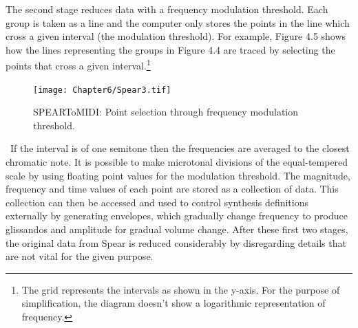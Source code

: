The second stage reduces data with a frequency modulation threshold. Each group is taken as a line and the computer only stores the points in the line which cross a given interval (the modulation threshold). For example, Figure 4.5 shows how the lines representing the groups in Figure 4.4 are traced by selecting the points that cross a given interval.\footnote{The grid represents the intervals as shown in the y-axis. For the purpose of simplification, the diagram doesn't show a logarithmic representation of frequency.} 
\begin{figure}[htbp] %
   \centering
   \texttt{[image: Chapter6/Spear3.tif]} %
   \caption{SPEARToMIDI: Point selection through frequency modulation threshold.}
   \label{fig:example}
\end{figure}\
If the interval is of one semitone then the frequencies are averaged to the closest chromatic note. It is possible to make microtonal divisions of the equal-tempered scale by using floating point values for the modulation threshold. The magnitude, frequency and time values of each point are stored as a collection of data. This collection can then be accessed and used to control synthesis definitions externally by generating envelopes, which gradually change frequency to produce glissandos and amplitude for gradual volume change. After these first two stages, the original data from Spear is reduced considerably by disregarding details that are not vital for the given purpose. 

